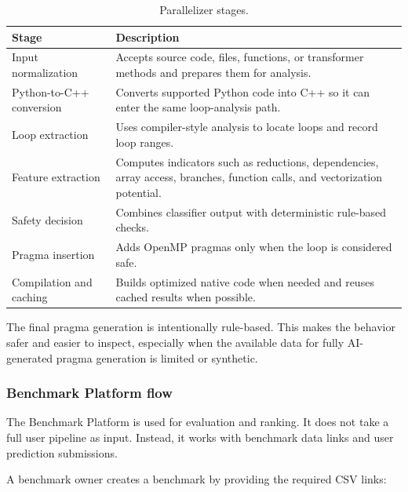 \documentclass[12pt,a4paper]{report}
\begin{document}
\begin{table}[!htbp]
\centering
\caption{Parallelizer stages.}
\label{tab:parallelizer-stages}
\small
\renewcommand{\arraystretch}{1.15}
\setlength{\tabcolsep}{4pt}
\begin{tabularx}{\textwidth}{p{}X}
\toprule
Stage & Description \\
\midrule
Input normalization &
Accepts source code, files, functions, or transformer methods and prepares them
for analysis. \\

Python-to-C++ conversion &
Converts supported Python code into C++ so it can enter the same loop-analysis
path. \\

Loop extraction &
Uses compiler-style analysis to locate loops and record loop ranges. \\

Feature extraction &
Computes indicators such as reductions, dependencies, array access, branches,
function calls, and vectorization potential. \\

Safety decision &
Combines classifier output with deterministic rule-based checks. \\

Pragma insertion &
Adds OpenMP pragmas only when the loop is considered safe. \\

Compilation and caching &
Builds optimized native code when needed and reuses cached results when
possible. \\
\bottomrule
\end{tabularx}
\renewcommand{\arraystretch}{1.0}
\end{table}

The final pragma generation is intentionally rule-based. This makes the behavior
safer and easier to inspect, especially when the available data for fully
AI-generated pragma generation is limited or synthetic.

\subsubsection*{Benchmark Platform flow}

The Benchmark Platform is used for evaluation and ranking. It does not take a
full user pipeline as input. Instead, it works with benchmark data links and user
prediction submissions.

A benchmark owner creates a benchmark by providing the required CSV links:
\end{document}
